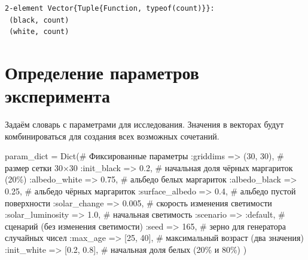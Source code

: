 \documentclass[
  12pt,
  a4paper,
  DIV=11,
  numbers=noendperiod]{scrreprt}
\newenvironment{Shaded}{\begin{snugshade}}{\end{snugshade}}
\newcommand{\CommentTok}[1]{\textcolor[rgb]{0.37,0.37,0.37}{#1}}
\newcommand{\FloatTok}[1]{\textcolor[rgb]{0.68,0.00,0.00}{#1}}
\newcommand{\FunctionTok}[1]{\textcolor[rgb]{0.28,0.35,0.67}{#1}}
\newcommand{\NormalTok}[1]{\textcolor[rgb]{0.00,0.23,0.31}{#1}}
\newcommand{\OperatorTok}[1]{\textcolor[rgb]{0.37,0.37,0.37}{#1}}
\begin{document}
\begin{verbatim}
2-element Vector{Tuple{Function, typeof(count)}}:
 (black, count)
 (white, count)
\end{verbatim}

\section{Определение параметров
эксперимента}\label{ux43eux43fux440ux435ux434ux435ux43bux435ux43dux438ux435-ux43fux430ux440ux430ux43cux435ux442ux440ux43eux432-ux44dux43aux441ux43fux435ux440ux438ux43cux435ux43dux442ux430-1}

Задаём словарь с параметрами для исследования. Значения в векторах будут
комбинироваться для создания всех возможных сочетаний.

\begin{Shaded}
\begin{Highlighting}[]
\NormalTok{param\_dict }\OperatorTok{=} \FunctionTok{Dict}\NormalTok{(}\CommentTok{\# Фиксированные параметры}
    \OperatorTok{:}\NormalTok{griddims }\OperatorTok{=\textgreater{}}\NormalTok{ (}\FloatTok{30}\NormalTok{, }\FloatTok{30}\NormalTok{),           }\CommentTok{\# размер сетки 30×30}
    \OperatorTok{:}\NormalTok{init\_black }\OperatorTok{=\textgreater{}} \FloatTok{0.2}\NormalTok{,               }\CommentTok{\# начальная доля чёрных маргариток (20\%)}
    \OperatorTok{:}\NormalTok{albedo\_white }\OperatorTok{=\textgreater{}} \FloatTok{0.75}\NormalTok{,             }\CommentTok{\# альбедо белых маргариток}
    \OperatorTok{:}\NormalTok{albedo\_black }\OperatorTok{=\textgreater{}} \FloatTok{0.25}\NormalTok{,             }\CommentTok{\# альбедо чёрных маргариток}
    \OperatorTok{:}\NormalTok{surface\_albedo }\OperatorTok{=\textgreater{}} \FloatTok{0.4}\NormalTok{,            }\CommentTok{\# альбедо пустой поверхности}
    \OperatorTok{:}\NormalTok{solar\_change }\OperatorTok{=\textgreater{}} \FloatTok{0.005}\NormalTok{,            }\CommentTok{\# скорость изменения светимости}
    \OperatorTok{:}\NormalTok{solar\_luminosity }\OperatorTok{=\textgreater{}} \FloatTok{1.0}\NormalTok{,          }\CommentTok{\# начальная светимость}
    \OperatorTok{:}\NormalTok{scenario }\OperatorTok{=\textgreater{}} \OperatorTok{:}\NormalTok{default,              }\CommentTok{\# сценарий (без изменения светимости)}
    \OperatorTok{:}\NormalTok{seed }\OperatorTok{=\textgreater{}} \FloatTok{165}\NormalTok{,                       }\CommentTok{\# зерно для генератора случайных чисел}
    \OperatorTok{:}\NormalTok{max\_age }\OperatorTok{=\textgreater{}}\NormalTok{ [}\FloatTok{25}\NormalTok{, }\FloatTok{40}\NormalTok{],               }\CommentTok{\# максимальный возраст (два значения)}
    \OperatorTok{:}\NormalTok{init\_white }\OperatorTok{=\textgreater{}}\NormalTok{ [}\FloatTok{0.2}\NormalTok{, }\FloatTok{0.8}\NormalTok{],           }\CommentTok{\# начальная доля белых (20\% и 80\%)}
\NormalTok{)}


\end{Highlighting}
\end{Shaded}
\end{document}
